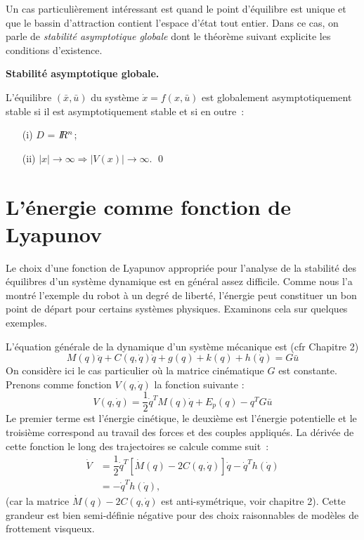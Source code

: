 Un cas particulièrement intéressant est quand le point d'équilibre est unique et que le bassin d'attraction contient l'espace d'état tout entier. Dans ce cas, on parle de {\it stabilité asymptotique globale} dont le théorème suivant explicite les conditions d'existence.

\begin{theoreme}\label{stabglob}{\bf Stabilité asymptotique globale.}

L'équilibre $(\bar x, \bar u)$ du système $\dot x = f(x,\bar u)$ est globalement asymptotiquement stable si il est asymptotiquement stable et si en outre~:\\
\begin{itemize}
\item[(i)] $D$ = $I \! \! R^n$;\\
\item[(ii)] $|x| \rightarrow \infty \Rightarrow |V(x)| \rightarrow \infty$. \qed
\end{itemize}
\end{theoreme}

\section{L'énergie comme fonction de Lyapunov}

Le choix d'une fonction de Lyapunov appropriée pour l'analyse de la stabilité des équilibres d'un système dynamique est en général assez difficile.  Comme nous l'a montré l'exemple du robot  à un degré de liberté, l'énergie peut constituer un bon point de départ pour certains systèmes physiques.   Examinons cela sur quelques exemples.\\


L'équation générale de la dynamique d'un système mécanique est (cfr Chapitre 2) 
$$
M(q) \ddot q + C(q, \dot q) \dot q + g(q) +k(q) +h(\dot q) =G \bar u
$$
On considère ici le cas particulier où la matrice cinématique $G$ est constante.
Prenons comme fonction $V(q, \dot q)$ la fonction suivante :
$$
V(q,\dot q) = \frac{1}{2} \dot q^T M(q) \dot q + E_{p}(q) - q^TG \bar u
$$
Le premier terme est l'énergie cinétique, le deuxième est l'énergie
potentielle et le troisième correspond au travail des forces et des couples appliqués. La dérivée de cette fonction le long des trajectoires se calcule comme suit~:
\begin{equation*} \begin{split}
\dot V &=  \dfrac{1}{2} \dot q^T[\dot M(q) -2C(q,\dot q)]\dot q -
\dot q^Th(\dot q)\\
&= -\dot q^Th(\dot q),
\end{split} \end{equation*}
(car la matrice $\dot M(q) -2C(q,\dot q)$ est anti-symétrique, voir chapitre 2). Cette grandeur est bien semi-définie négative pour des choix raisonnables de modèles de
frottement visqueux.\\

